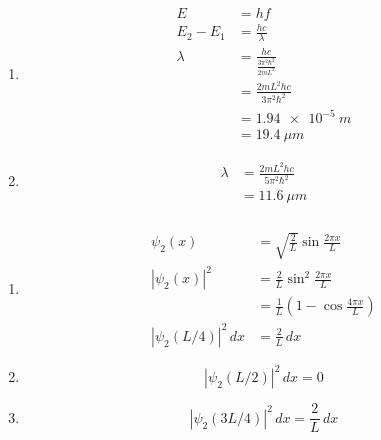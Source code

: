 \documentclass{article}
\begin{document}
\setcounter{subsubsection}{46}
\subsubsection{}

\begin{enumerate}
  \item

        \begin{align*}
          E         & = h f                                         \\
          E_2 - E_1 & = \frac{h c}{\lambda}                         \\
          \lambda   & = \frac{h c}{\frac{3 \pi^2 \hbar^2}{2 m L^2}} \\
                    & = \frac{2 m L^2 h c}{3 \pi^2 \hbar^2}         \\
                    & = \qty{1.94e-5}{m}                            \\
                    & = \qty{19.4}{\mu m}
        \end{align*}

  \item

        \begin{align*}
          \lambda & = \frac{2 m L^2 h c}{5 \pi^2 \hbar^2} \\
                  & = \qty{11.6}{\mu m}
        \end{align*}
\end{enumerate}

\setcounter{subsubsection}{48}
\subsubsection{}

\begin{enumerate}
  \item

        \begin{align*}
          \psi_2(x)              & = \sqrt{\frac{2}{L}} \sin \frac{2 \pi x}{L}             \\
          |\psi_2(x)|^2          & = \frac{2}{L} \sin^2 \frac{2 \pi x}{L}                  \\
                                 & = \frac{1}{L} \left( 1 - \cos \frac{4 \pi x}{L} \right) \\
          |\psi_2(L / 4)|^2 \,dx & = \frac{2}{L} \,dx
        \end{align*}

  \item \[|\psi_2(L / 2)|^2 \,dx = 0\]

  \item \[|\psi_2(3 L / 4)|^2 \,dx = \frac{2}{L} \,dx\]
\end{enumerate}
\end{document}

